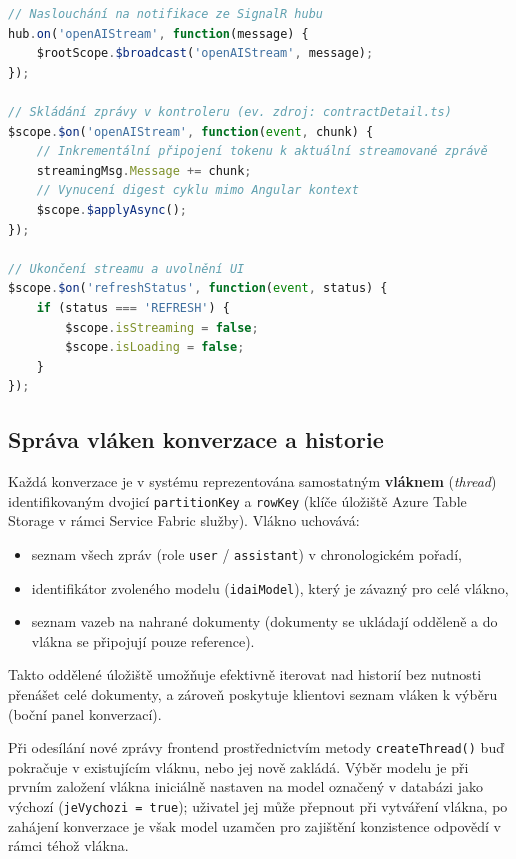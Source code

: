 \begin{lstlisting}[language=JavaScript, caption={Zpracování streamované odpovědi v AngularJS}]
// Naslouchání na notifikace ze SignalR hubu
hub.on('openAIStream', function(message) {
    $rootScope.$broadcast('openAIStream', message);
});

// Skládání zprávy v kontroleru (ev. zdroj: contractDetail.ts)
$scope.$on('openAIStream', function(event, chunk) {
    // Inkrementální připojení tokenu k aktuální streamované zprávě
    streamingMsg.Message += chunk;
    // Vynucení digest cyklu mimo Angular kontext
    $scope.$applyAsync();
});

// Ukončení streamu a uvolnění UI
$scope.$on('refreshStatus', function(event, status) {
    if (status === 'REFRESH') {
        $scope.isStreaming = false;
        $scope.isLoading = false;
    }
});
\end{lstlisting}

\subsection{Správa vláken konverzace a historie}

Každá konverzace je v systému reprezentována samostatným \textbf{vláknem} (\textit{thread}) identifikovaným dvojicí \texttt{partitionKey} a \texttt{rowKey} (klíče úložiště Azure Table Storage v rámci Service Fabric služby). Vlákno uchovává:
\begin{itemize}
    \item seznam všech zpráv (role \texttt{user} / \texttt{assistant}) v chronologickém pořadí,
    \item identifikátor zvoleného modelu (\texttt{idaiModel}), který je závazný pro celé vlákno,
    \item seznam vazeb na nahrané dokumenty (dokumenty se ukládají odděleně a do vlákna se připojují pouze reference).
\end{itemize}

Takto oddělené úložiště umožňuje efektivně iterovat nad historií bez nutnosti přenášet celé dokumenty, a zároveň poskytuje klientovi seznam vláken k výběru (boční panel konverzací).

Při odesílání nové zprávy frontend prostřednictvím metody \texttt{createThread()} buď pokračuje v existujícím vláknu, nebo jej nově zakládá. Výběr modelu je při prvním založení vlákna iniciálně nastaven na model označený v databázi jako výchozí (\texttt{jeVychozi = true}); uživatel jej může přepnout při vytváření vlákna, po zahájení konverzace je však model uzamčen pro zajištění konzistence odpovědí v rámci téhož vlákna.

